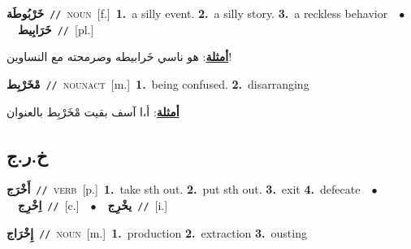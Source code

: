\documentclass[10pt,a4paper,twoside]{article} %
\begin{document}
\begin{multicols}{2}
{\setlength\topsep{0pt}\textbf{\foreignlanguage{arabic}{خَرْبُوطَة}}\ {\color{gray}\texttt{//}\color{black}}\ \textsc{noun}\ [f.]\ \textbf{1.}~a silly event.  \textbf{2.}~a silly story.  \textbf{3.}~a reckless behavior\ \ $\bullet$\ \ \setlength\topsep{0pt}\textbf{\foreignlanguage{arabic}{خَرَابِيط}}\ {\color{gray}\texttt{//}\color{black}}\ [pl.]\  \begin{flushright}\color{gray}\foreignlanguage{arabic}{\textbf{\underline{\foreignlanguage{arabic}{أمثلة}}}: هو ناسي خَرابيطه وصرمحته مع النساوين!}\end{flushright}\color{black}} \vspace{2mm}

{\setlength\topsep{0pt}\textbf{\foreignlanguage{arabic}{مْخَرْبِط}}\ {\color{gray}\texttt{//}\color{black}}\ \textsc{noun\textunderscore act}\ [m.]\ \textbf{1.}~being confused.  \textbf{2.}~disarranging\  \begin{flushright}\color{gray}\foreignlanguage{arabic}{\textbf{\underline{\foreignlanguage{arabic}{أمثلة}}}: أ،ا آسف بقيت مْخَرْبِط بالعنوان}\end{flushright}\color{black}} \vspace{2mm}

\vspace{-3mm}
\subsection*{\color{blue}\foreignlanguage{arabic}{خ.ر.ج}\color{blue}{}} 

{\setlength\topsep{0pt}\textbf{\foreignlanguage{arabic}{أَخْرَج}}\ {\color{gray}\texttt{//}\color{black}}\ \textsc{verb}\ [p.]\ \textbf{1.}~take sth out.  \textbf{2.}~put sth out.  \textbf{3.}~exit  \textbf{4.}~defecate\ \ $\bullet$\ \ \setlength\topsep{0pt}\textbf{\foreignlanguage{arabic}{اِخْرِج}}\ {\color{gray}\texttt{//}\color{black}}\ [c.]\ \ $\bullet$\ \ \setlength\topsep{0pt}\textbf{\foreignlanguage{arabic}{يخْرِج}}\ {\color{gray}\texttt{//}\color{black}}\ [i.]\ } \vspace{2mm}

{\setlength\topsep{0pt}\textbf{\foreignlanguage{arabic}{إِخْرَاج}}\ {\color{gray}\texttt{//}\color{black}}\ \textsc{noun}\ [m.]\ \textbf{1.}~production  \textbf{2.}~extraction  \textbf{3.}~ousting\ } \vspace{2mm}


\end{multicols}
\end{document}
